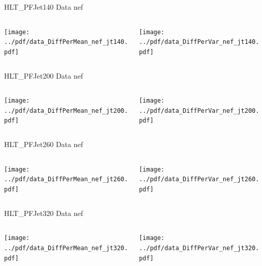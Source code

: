 \documentclass[9pt]{beamer}
\begin{document}
\begin{frame}[t]{HLT\_PFJet140 Data nef}
\begin{columns}[T]
  \begin{column}{.5\textwidth}
  \texttt{[image: ../pdf/data\_DiffPerMean\_nef\_jt140.pdf]}
  \end{column}
  \begin{column}{.5\textwidth}
  \texttt{[image: ../pdf/data\_DiffPerVar\_nef\_jt140.pdf]}
  \end{column}
\end{columns}
\end{frame}

\begin{frame}[t]{HLT\_PFJet200 Data nef}
\begin{columns}[T]
  \begin{column}{.5\textwidth}
  \texttt{[image: ../pdf/data\_DiffPerMean\_nef\_jt200.pdf]}
  \end{column}
  \begin{column}{.5\textwidth}
  \texttt{[image: ../pdf/data\_DiffPerVar\_nef\_jt200.pdf]}
  \end{column}
\end{columns}
\end{frame}

\begin{frame}[t]{HLT\_PFJet260 Data nef}
\begin{columns}[T]
  \begin{column}{.5\textwidth}
  \texttt{[image: ../pdf/data\_DiffPerMean\_nef\_jt260.pdf]}
  \end{column}
  \begin{column}{.5\textwidth}
  \texttt{[image: ../pdf/data\_DiffPerVar\_nef\_jt260.pdf]}
  \end{column}
\end{columns}
\end{frame}

\begin{frame}[t]{HLT\_PFJet320 Data nef}
\begin{columns}[T]
  \begin{column}{.5\textwidth}
  \texttt{[image: ../pdf/data\_DiffPerMean\_nef\_jt320.pdf]}
  \end{column}
  \begin{column}{.5\textwidth}
  \texttt{[image: ../pdf/data\_DiffPerVar\_nef\_jt320.pdf]}
  \end{column}
\end{columns}
\end{frame}
\end{document}
